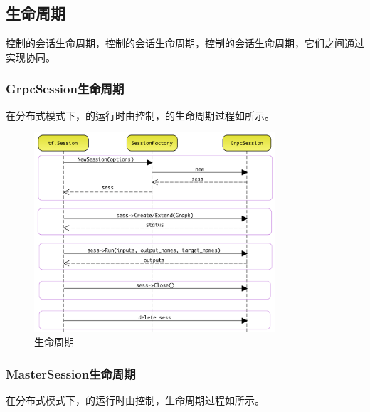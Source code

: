 \begin{content}
\subsection{生命周期}

控制的会话生命周期，控制的会话生命周期，控制的会话生命周期，它们之间通过实现协同。

\subsubsection{GrpcSession生命周期}

在分布式模式下，的运行时由控制，的生命周期过程如所示。

\begin{figure}[H]
\centering
\includegraphics[width=0.8\textwidth]{figures/dist-grpc-session-life-cycle.png}
\caption{生命周期}
 \label{fig:dist-grpc-session-life-cycle}
\end{figure}

\subsubsection{MasterSession生命周期}

在分布式模式下，的运行时由控制，生命周期过程如所示。


\end{content}
